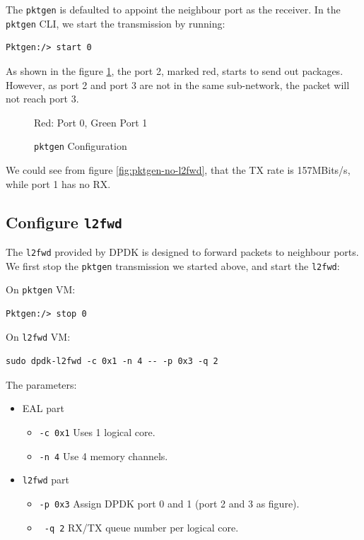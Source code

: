 \documentclass[12pt]{article}
\begin{document}
The \texttt{pktgen} is defaulted to appoint the neighbour port as the receiver. In the \texttt{pktgen} CLI, we start the transmission by running:

\begin{lstlisting}
Pktgen:/> start 0
\end{lstlisting}

As shown in the figure \ref{fig:pktgen}, the port 2, marked red, starts to send out packages. However, as port 2 and port 3 are not in the same sub-network, the packet will not reach port 3.

\begin{figure}[ht]
    \centering
    \def\svgwidth{0.3\textwidth}
    \tiny
    
    
    Red: Port 0, Green Port 1
    \caption{\texttt{pktgen} Configuration}
    \label{fig:pktgen}
\end{figure}

We could see from figure \ref{fig:pktgen-no-l2fwd}, that the TX rate is 157MBits/s, while port 1 has no RX.


\subsection{Configure \texttt{l2fwd}}

The \texttt{l2fwd} provided by DPDK is designed to forward packets to neighbour ports. We first stop the \texttt{pktgen} transmission we started above, and start the \texttt{l2fwd}:

On \texttt{pktgen} VM:
\begin{lstlisting}
Pktgen:/> stop 0
\end{lstlisting}

On \texttt{l2fwd} VM:
\begin{lstlisting}
sudo dpdk-l2fwd -c 0x1 -n 4 -- -p 0x3 -q 2
\end{lstlisting}

The parameters:

\begin{itemize}
    \item EAL part
    \begin{itemize}
        \item \texttt{-c 0x1} Uses 1 logical core.
        \item \texttt{-n 4} Use 4 memory channels.
    \end{itemize}
    \item \texttt{l2fwd} part
    \begin{itemize}
        \item \texttt{-p 0x3} Assign DPDK port 0 and 1 (port 2 and 3 as figure).
        \item \texttt{ -q 2} RX/TX queue number per logical core.
    \end{itemize}
\end{itemize}
\end{document}
